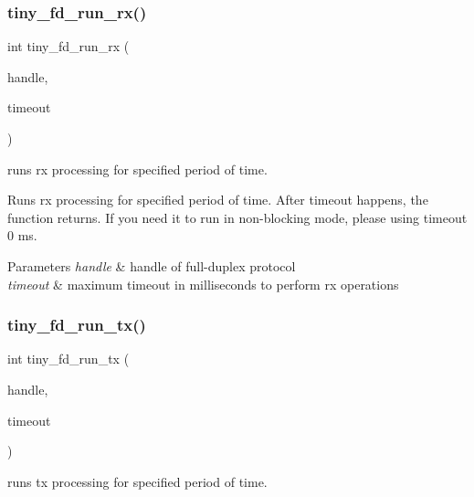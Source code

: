 \subsubsection{\texorpdfstring{tiny\+\_\+fd\+\_\+run\+\_\+rx()}{tiny\_fd\_run\_rx()}}
{\footnotesize\ttfamily int tiny\+\_\+fd\+\_\+run\+\_\+rx (\begin{DoxyParamCaption}\item[{\hyperlink{group__FULL__DUPLEX__API_ga91e6b79431fe38570fb102701ef0b7e8}{tiny\+\_\+fd\+\_\+handle\+\_\+t}}]{handle,  }\item[{uint16\+\_\+t}]{timeout }\end{DoxyParamCaption})}



runs rx processing for specified period of time. 

Runs rx processing for specified period of time. After timeout happens, the function returns. If you need it to run in non-\/blocking mode, please using timeout 0 ms.


\begin{DoxyParams}{Parameters}
{\em handle} & handle of full-\/duplex protocol \\
\hline
{\em timeout} & maximum timeout in milliseconds to perform rx operations \\
\hline
\end{DoxyParams}
\mbox{\label{group__FULL__DUPLEX__API_ga601c9874a570331580856c1ea28f7914}} 
\subsubsection{\texorpdfstring{tiny\+\_\+fd\+\_\+run\+\_\+tx()}{tiny\_fd\_run\_tx()}}
{\footnotesize\ttfamily int tiny\+\_\+fd\+\_\+run\+\_\+tx (\begin{DoxyParamCaption}\item[{\hyperlink{group__FULL__DUPLEX__API_ga91e6b79431fe38570fb102701ef0b7e8}{tiny\+\_\+fd\+\_\+handle\+\_\+t}}]{handle,  }\item[{uint16\+\_\+t}]{timeout }\end{DoxyParamCaption})}



runs tx processing for specified period of time. 

